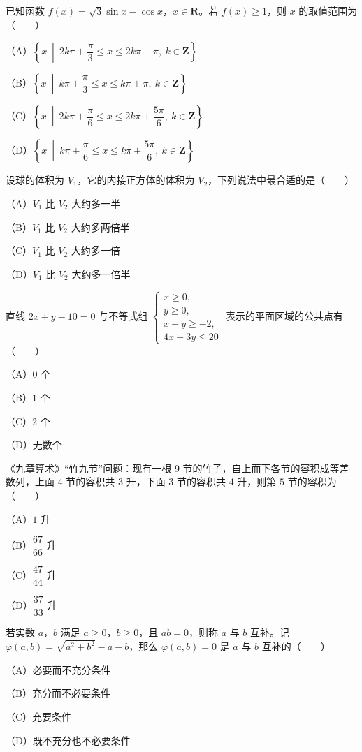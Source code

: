 \begin{question}
已知函数 $f(x)=\sqrt3\sin x-\cos x$，$x\in\mathbf R$。若 $f(x)\geqslant1$，则 $x$ 的取值范围为\mbox{（　　）}

（A）$\left\{x\ \middle|\ 2k\pi+\dfrac\pi3\leqslant x\leqslant2k\pi+\pi,\ k\in\mathbf Z\right\}$

（B）$\left\{x\ \middle|\ k\pi+\dfrac\pi3\leqslant x\leqslant k\pi+\pi,\ k\in\mathbf Z\right\}$

（C）$\left\{x\ \middle|\ 2k\pi+\dfrac\pi6\leqslant x\leqslant2k\pi+\dfrac{5\pi}6,\ k\in\mathbf Z\right\}$

（D）$\left\{x\ \middle|\ k\pi+\dfrac\pi6\leqslant x\leqslant k\pi+\dfrac{5\pi}6,\ k\in\mathbf Z\right\}$

\end{question}
\begin{question}
设球的体积为 $V_1$，它的内接正方体的体积为 $V_2$，下列说法中最合适的是\mbox{（　　）}

（A）$V_1$ 比 $V_2$ 大约多一半

（B）$V_1$ 比 $V_2$ 大约多两倍半

（C）$V_1$ 比 $V_2$ 大约多一倍

（D）$V_1$ 比 $V_2$ 大约多一倍半

\end{question}
\begin{question}
直线 $2x+y-10=0$ 与不等式组 $\begin{cases}x\geqslant0,\\y\geqslant0,\\x-y\geqslant-2,\\4x+3y\leqslant20\end{cases}$ 表示的平面区域的公共点有\mbox{（　　）}

（A）$0$ 个

（B）$1$ 个

（C）$2$ 个

（D）无数个

\end{question}
\begin{question}
《九章算术》“竹九节”问题：现有一根 $9$ 节的竹子，自上而下各节的容积成等差数列，上面 $4$ 节的容积共 $3$ 升，下面 $3$ 节的容积共 $4$ 升，则第 $5$ 节的容积为\mbox{（　　）}

（A）$1$ 升

（B）$\dfrac{67}{66}$ 升

（C）$\dfrac{47}{44}$ 升

（D）$\dfrac{37}{33}$ 升

\end{question}
\begin{question}
若实数 $a$，$b$ 满足 $a\geqslant0$，$b\geqslant0$，且 $ab=0$，则称 $a$ 与 $b$ 互补。记 $\varphi(a,b)=\sqrt{a^2+b^2}-a-b$，那么 $\varphi(a,b)=0$ 是 $a$ 与 $b$ 互补的\mbox{（　　）}

（A）必要而不充分条件

（B）充分而不必要条件

（C）充要条件

（D）既不充分也不必要条件

\end{question}

